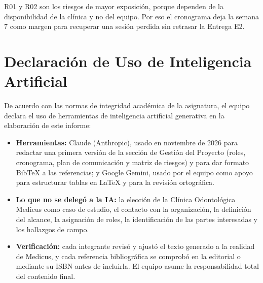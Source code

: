 R01 y R02 son los riesgos de mayor exposici{\'o}n, porque dependen de la disponibilidad de la cl{\'i}nica y no del equipo. Por eso el cronograma deja la semana 7 como margen para recuperar una sesi{\'o}n perdida sin retrasar la Entrega E2.

\section{Declaraci{\'o}n de Uso de Inteligencia Artificial}

De acuerdo con las normas de integridad acad{\'e}mica de la asignatura, el equipo declara el uso de herramientas de inteligencia artificial generativa en la elaboraci{\'o}n de este informe:

\begin{itemize}
    \item \textbf{Herramientas:} Claude (Anthropic), usado en noviembre de 2026 para redactar una primera versi{\'o}n de la secci{\'o}n de Gesti{\'o}n del Proyecto (roles, cronograma, plan de comunicaci{\'o}n y matriz de riesgos) y para dar formato BibTeX a las referencias; y Google Gemini, usado por el equipo como apoyo para estructurar tablas en LaTeX y para la revisi{\'o}n ortogr{\'a}fica.
    \item \textbf{Lo que no se deleg{\'o} a la IA:} la elecci{\'o}n de la Cl{\'i}nica Odontol{\'o}gica Medicus como caso de estudio, el contacto con la organizaci{\'o}n, la definici{\'o}n del alcance, la asignaci{\'o}n de roles, la identificaci{\'o}n de las partes interesadas y los hallazgos de campo.
    \item \textbf{Verificaci{\'o}n:} cada integrante revis{\'o} y ajust{\'o} el texto generado a la realidad de Medicus, y cada referencia bibliogr{\'a}fica se comprob{\'o} en la editorial o mediante su ISBN antes de incluirla. El equipo asume la responsabilidad total del contenido final.
\end{itemize}
